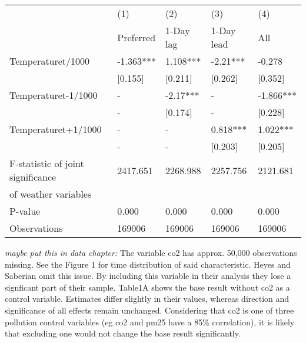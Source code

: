\documentclass[11pt]{article}
\begin{document}
	\begin{center}
	 \label{tab:title} 
	\begin{tabular}{lllll}
		\toprule
		{} &        (1) &       (2) &       (3) &        (4) \\
		&  Preferred &    1-Day lag &   1-Day lead &          All \\
		\midrule
		Temperaturet/1000                 &  -1.363*** &  1.108*** &  -2.21*** &     -0.278 \\
		&    [0.155] &   [0.211] &   [0.262] &    [0.352] \\
		Temperaturet-1/1000               &          - &  -2.17*** &         - &  -1.866*** \\
		&          - &   [0.174] &         - &    [0.228] \\
		Temperaturet+1/1000               &          - &         - &  0.818*** &   1.022*** \\
		&            - &            - &      [0.203] &      [0.205] \\
		F-statistic of joint significance &   2417.651 &  2268.988 &  2257.756 &   2121.681 \\
		of weather variables              &            &           &           &            \\
		P-value                           &      0.000 &     0.000 &     0.000 &      0.000 \\
		\midrule
		Observations                      &     169006 &    169006 &    169006 &     169006 \\
		\bottomrule
	\end{tabular}
	\end{center}

	\textit{maybe put this in data chapter:} The variable co2 has approx. 50,000 observations missing. See the Figure 1 for time distribution of said characteristic. Heyes and Saberian omit this issue. By including this variable in their analysis they lose a signficant part of their sample. Table1A shows the base result without co2 as a control variable. Estimates differ slightly in their values, whereas direction and significance of all effects remain unchanged. Considering that co2 is one of three pollution control variables (eg co2 and pm25 have a 85\% correlation), it is likely that excluding one would not change the base result significantly. 
\end{document}
